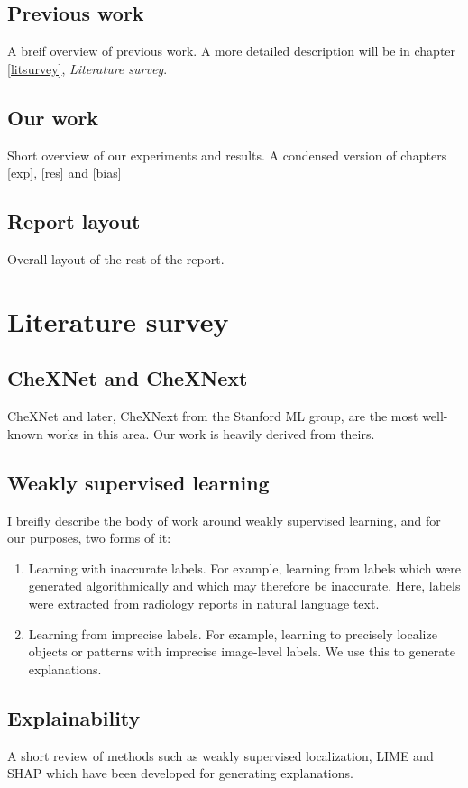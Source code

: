 \documentclass[11pt,twoside,a4paper]{report}
\begin{document}
    \section{Previous work}
    A breif overview of previous work. A more detailed description will be in
    chapter \ref{litsurvey}, \emph{Literature survey}.
    \section{Our work}
    Short overview of our experiments and results. A condensed version of chapters \ref{exp}, \ref{res} and
    \ref{bias}
    \section{Report layout}
    Overall layout of the rest of the report.
\chapter{Literature survey\label{litsurvey}}
    \section{CheXNet and CheXNext}
    CheXNet and later, CheXNext from the Stanford ML group, are the most well-known works in this area.
    Our work is heavily derived from theirs.
    \section{Weakly supervised learning}
    I breifly describe the body of work around weakly supervised learning, and for our purposes, two forms of it:
    \begin{enumerate}
        \item{Learning with inaccurate labels. For example, learning from labels which were generated algorithmically
        and which may therefore be inaccurate. Here, labels were extracted from radiology reports in natural language text.}
        \item{Learning from imprecise labels. For example, learning to precisely localize objects or patterns
        with imprecise image-level labels. We use this to generate explanations.}
    \end{enumerate}
        \section{Explainability}
    A short review of methods such as weakly supervised localization, LIME and SHAP which have been developed for 
    generating explanations.
\end{document}
